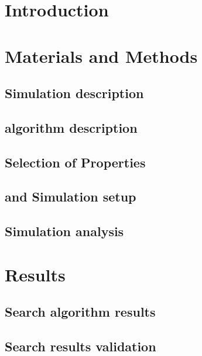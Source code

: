 \documentclass[metals,article,submit,pdftex,moreauthors]{Definitions/mdpi}
\begin{document}
\section{Introduction}
	

\section{Materials and Methods}
	
	\subsection{Simulation description}
	

	\subsection{ algorithm description}
	

	\subsection{Selection of Properties}
	

	\subsection{ and Simulation setup}
	

	\subsection{Simulation analysis}
	

\section{Results}
	\subsection{Search algorithm results}
	

	\subsection{Search results validation}
	
	\FloatBarrier
\end{document}
